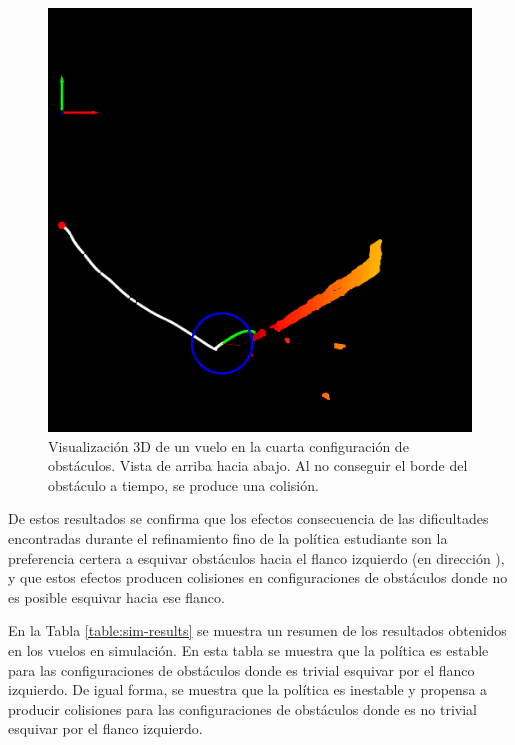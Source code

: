 \begin{figure}[H]
    \centering
    \includegraphics[scale=0.25]{partes/img/depth-wall-5-crash.png}
    \caption[Visualización 3D de un vuelo en la cuarta configuración de obstáculos (5). Vista de arriba hacia abajo. Colisión.]{Visualización 3D de un vuelo en la cuarta configuración de obstáculos. Vista de arriba hacia abajo. Al no conseguir el borde del obstáculo a tiempo, se produce una colisión.}
    \label{depth-wall-5}
\end{figure}

De estos resultados se confirma que los efectos consecuencia de las dificultades encontradas durante el refinamiento fino de la política estudiante son la preferencia certera a esquivar obstáculos hacia el flanco izquierdo (en dirección ), y que estos efectos producen colisiones en configuraciones de obstáculos donde no es posible esquivar hacia ese flanco.

En la Tabla \ref{table:sim-results} se muestra un resumen de los resultados obtenidos en los vuelos en simulación. En esta tabla se muestra que la política es estable para las configuraciones de obstáculos donde es trivial esquivar por el flanco izquierdo. De igual forma, se muestra que la política es inestable y propensa a producir colisiones para las configuraciones de obstáculos donde es no trivial esquivar por el flanco izquierdo.

